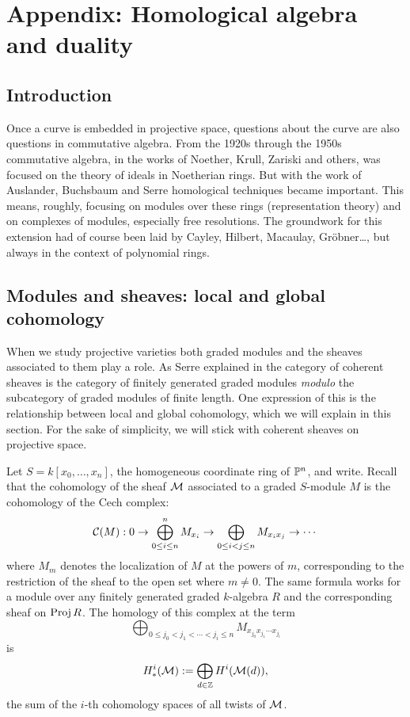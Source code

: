 

\chapter{Appendix: Homological algebra and duality}\label{CA appendix}
\section{Introduction} 

Once a curve is embedded in projective space, questions about the curve are also questions in commutative algebra. From the 1920s through the 1950s commutative algebra, in the works of Noether,  Krull,  Zariski and others, was focused on the theory of ideals in Noetherian rings. But with the work of Auslander, Buchsbaum and Serre homological techniques became important. This means, roughly, focusing on modules over these rings (representation theory) and on complexes of modules, especially free resolutions. The groundwork for this extension had of course been laid by Cayley, Hilbert, Macaulay, Gr\"obner\dots, but always in the context of polynomial rings. 

\section{Modules and sheaves: local and global cohomology}\label{local coho section}

When we study projective varieties both graded modules and the sheaves associated to them play a role. As Serre explained in %
the category of coherent sheaves is the category of finitely generated graded modules \emph{modulo} the subcategory of graded modules of finite length. One expression of this is the relationship between local and global cohomology, which we will explain in this section. For the sake of simplicity, we will stick with coherent sheaves on projective space.

Let $S= k[x_{0}, \dots, x_{n}]$, the homogeneous coordinate ring of $\PP^{n}$, and write. Recall that the cohomology of the sheaf $\cM$ associated to a graded $S$-module $M$ is the cohomology of the Cech complex:
$$
\cC(M): 0\to \bigoplus_{0\leq i \leq n}^{n} M_{x_{i}} \to \bigoplus_{0\leq i<j\leq n} M_{x_{i}x_{j}} \to \cdots
$$
where $M_{m}$ denotes the localization of $M$ at the powers of $m$, corresponding to the restriction of the sheaf to the open set where $m \neq 0$. The same formula works for a module 
over any finitely generated graded $k$-algebra $R$ and the corresponding sheaf on $\Proj R$.
The homology of this complex at the term
$$
\bigoplus_{0\leq j_{0}<j_{1}<\cdots<j_{i}\leq n} M_{x_{j_{0}}x_{j_{1}}\cdots x_{j_{i}}}
$$
is 
$$
H^{i}_{*}(\cM):= \bigoplus_{d\in \ZZ} H^{i}(\cM(d)),
$$
the sum of the $i$-th cohomology spaces of all twists of $\cM$.

